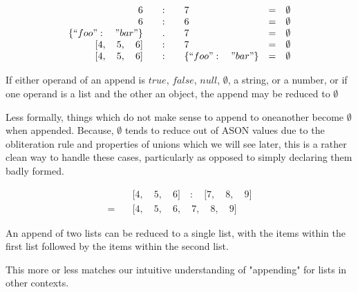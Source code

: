 \documentclass[letterpaper]{article}
\begin{document}
\begin{prule}
\begin{equation}
\begin{array}{rclcl}
6 \quad&:&\quad 7 & = & \emptyset \\
6 \quad&:&\quad 6 & = & \emptyset \\
\{``foo":\quad"bar"\} \quad&.&\quad 7 & = & \emptyset \\
{[}4,\quad5,\quad6] \quad&:&\quad 7 & = & \emptyset \\
{[}4,\quad5,\quad6] \quad&:&\quad \{``foo":\quad"bar"\} & = & \emptyset \\
\end{array}
\end{equation}

If either operand of an append is \(true\), \(false\), \(null\), \(\emptyset\),
a string, or a number, or if one operand is a list and the other an object, the
append may be reduced to \(\emptyset\)
\end{prule}

Less formally, things which do not make sense to append to oneanother become
\(\emptyset\) when appended. Because, \(\emptyset\) tends to reduce out
of ASON values due to the obliteration rule and properties of unions which we
will see later, this is a rather clean way to handle these cases, particularly
as opposed to simply declaring them badly formed.

\begin{prule}
\begin{equation}
\begin{split}
& {[}4,\quad5,\quad6] \quad:\quad {[}7,\quad8,\quad9] \\
=\quad & {[}4,\quad5,\quad6,\quad7,\quad8,\quad9]
\end{split}
\end{equation}

An append of two lists can be reduced to a single list, with the items within
the first list followed by the items within the second list.
\end{prule}

This more or less matches our intuitive understanding of "appending" for lists
in other contexts.
\end{document}
